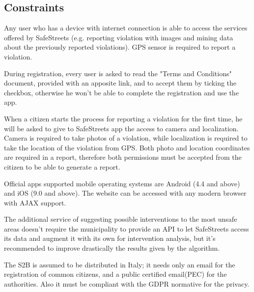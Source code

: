\subsection{Constraints}

Any user who has a device with internet connection is able to access the services offered by SafeStreets (e.g. reporting violation with images and mining data about the previously reported violations). GPS sensor is required to report a violation.

During registration, every user is asked to read the "Terms and Conditions" document, provided with an apposite link, and to accept them by ticking the checkbox, otherwise he won't be able to complete the registration and use the app.

When a citizen starts the process for reporting a violation for the first time, he will be asked to give to SafeStreets app the access to camera and localization. Camera is required to take photos of a violation, while localization is required to take the location of the violation from GPS. Both photo and location coordinates are required in a report, therefore both permissions must be accepted from the citizen to be able to generate a report.

Official apps supported mobile operating systems are Android (4.4 and above) and iOS (9.0 and above). The website can be accessed with any modern browser with AJAX support.

The additional service of suggesting possible interventions to the most unsafe areas doesn't require the municipality to provide an API to let SafeStreets access its data and augment it with its own for intervention analysis, but it's recommended to improve drastically the results given by the algorithm.

The S2B is assumed to be distributed in Italy; it needs only an email for the registration of common citizens, and a public certified email(PEC) for the authorities. Also it must be compliant with the GDPR normative for the privacy.